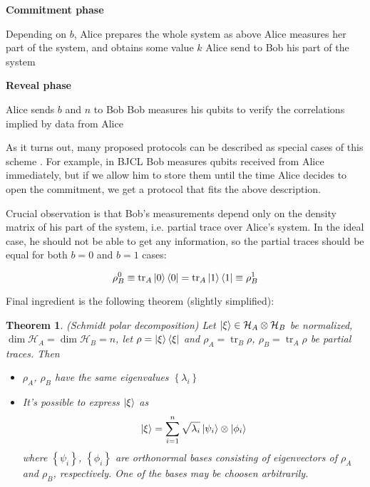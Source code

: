 \documentclass[10pt]{article}
\newtheorem{theorem}{Theorem}
\begin{document}
\vspace{2mm}

\NoCaptionOfAlgo
\begin{algorithm}[H]
\caption{\textbf{Commitment phase}}
Depending on \(b\), Alice prepares the whole system as above \;
Alice measures her part of the system, and obtains some value \(k\) \;
Alice send to Bob his part of the system \;
\end{algorithm}

\vspace{2mm}

\NoCaptionOfAlgo
\begin{algorithm}[H]
\caption{\textbf{Reveal phase}}
Alice sends \(b\) and \(n\) to Bob \;
Bob measures his qubits to verify the correlations implied by data from Alice \;
\end{algorithm}

\vspace{2mm}

As it turns out, many proposed protocols can be described as special cases of this scheme 
\cite{Lo96}. For example, in BJCL Bob measures qubits received from Alice immediately, but if we
allow him to store them until the time Alice decides to open the commitment, we get a protocol
that fits the above description.

Crucial observation is that Bob's measurements depend only on the density matrix of his part
of the system, i.e. partial trace over Alice's system. In the ideal case, he should not be able to
get any information, so the partial traces should be equal for both \(b=0\) and \(b=1\) cases:

\[
\rho_B^0\equiv
\operatorname{tr}_A \Ket{0}\Bra{0} = \operatorname{tr}_A \Ket{1}\Bra{1}
\equiv\rho_B^1
\]

Final ingredient is the following theorem (slightly simplified)\cite{Hughston93}: 

\vspace{5mm}

\begin{theorem}(Schmidt polar decomposition) 
Let \(\Ket{\xi}\in\mathcal{H}_A\otimes\mathcal{H}_B\) be normalized, 
\(\dim \mathcal{H}_A=\dim\mathcal{H}_B=n\), let  \(\rho=\Ket{\xi}\Bra{\xi}\)
and \(\rho_A=\operatorname{tr}_B\rho\), \(\rho_B=\operatorname{tr}_A\rho\) be partial traces. Then
\begin{itemize}
  \item \(\rho_A\), \(\rho_B\) have the same eigenvalues \(\left\{\lambda_i\right\}\)
  \item It's possible to express \(\Ket{\xi}\) as 
\[
    \Ket{\xi}=\sum_{i=1}^n\sqrt{\lambda_i}\Ket{\psi_i}\otimes\Ket{\phi_i}
\]
    where \(\left\{\psi_i\right\}\), \(\left\{\phi_i\right\}\) are orthonormal bases consisting of
    eigenvectors of \(\rho_A\) and \(\rho_B\), respectively. One of the bases may be choosen
    arbitrarily.
\end{itemize}
\end{theorem}
\end{document}
